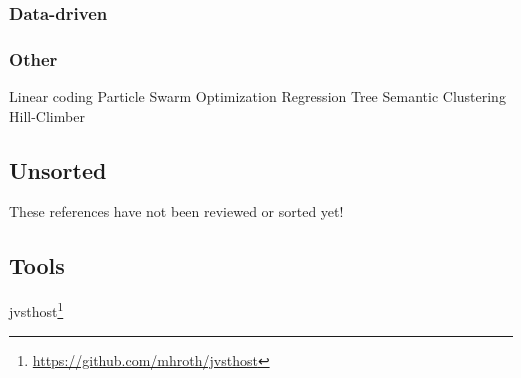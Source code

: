 \subsubsection{Data-driven}
\cite{roth2011comparison}\cite{mcartwright2014}

\subsubsection{Other}
Linear coding \cite{mintz2007toward}
Particle Swarm Optimization \cite{heise2009automatic}\cite{munoz2011opposition}
Regression Tree \cite{stowell2010making}
Semantic Clustering \cite{clement2011automatic}
Hill-Climber \cite{roth2011comparison}

\subsection{Unsorted}
These references have not been reviewed or sorted yet!

\cite{takala1993using}
\cite{hourdin1997sound}
\cite{horner1998nested}
\cite{wehn1998using}
\cite{garcia2001automatic}
\cite{dahlstedt2001creating}
\cite{garcia2001growing}
\cite{jehan2001perceptual}
\cite{su2002class}
\cite{le2002neural}
\cite{arfib2002strategies}
\cite{miranda2004crossroads}
\cite{schatter2005synaesthetic}
\cite{gounaropoulos2006synthesising}
\cite{lai2006automated}
\cite{mcdermott2007evolutionary}
\cite{yee2007automated}
\cite{yee2007evolving}
\cite{howard2007timbral}
\cite{mcdermott2008evolutionary}
\cite{yee2011automatic}
\cite{mitchell2012automated}
\cite{povscic2013controlling}
\cite{seago2013new}
\cite{krekovic2014intelligent}
\cite{macret2014automatic}
\cite{itoyama2014parameter}
\cite{huang2014active}
\cite{fasciani2016tsam}
\cite{krekovic2016algorithm}
\cite{tatar2016automatic}
\cite{yee2016use}
\cite{smith2017play}
\cite{yee2018automatic}
\cite{luke2019stochastic}

\subsection{Tools}
jvsthost\footnote{\url{https://github.com/mhroth/jvsthost}}
